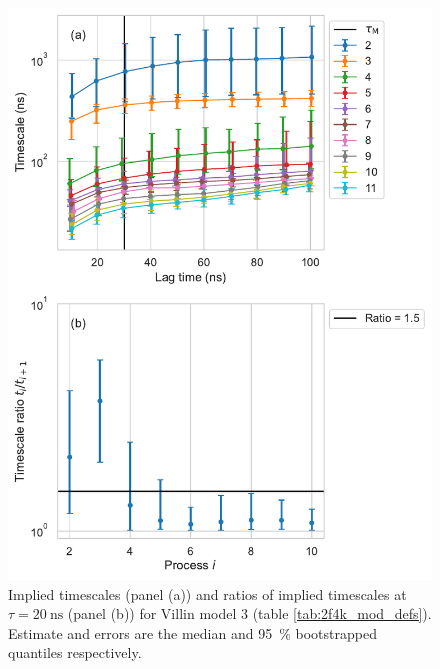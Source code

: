 \documentclass{article}
\begin{document}
\begin{figure}
    \centering
    \includegraphics[height=0.65\textheight]{figures/its/villin/Villin_model_dist._method_m1.pdf}
    \caption{Implied timescales (panel (a)) and ratios of implied timescales at $\tau=\SI{20}{\nano\second}$ (panel (b)) for Villin model 3 (table \ref{tab:2f4k_mod_defs}). Estimate and errors are the median and \SI{95}{\percent} bootstrapped quantiles respectively.}
    \label{fig:its_villin_3}
\end{figure}
\end{document}
